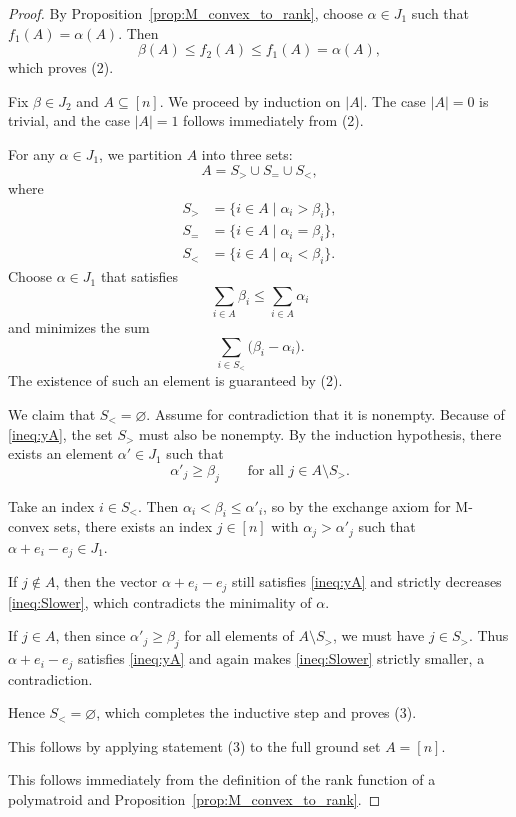 \documentclass[11pt]{article}
\theoremstyle{definition}
\theoremstyle{remark}
\begin{document}
\begin{proof}
\medskip
{}
By Proposition~\ref{prop:M_convex_to_rank}, choose $\alpha\in J_1$ such
that $f_1(A)=\alpha(A)$. Then
\[
    \beta(A)\leq f_2(A)\leq f_1(A)=\alpha(A),
\]
which proves (2).

\medskip
{}
Fix $\beta \in J_2$ and $A \subseteq [n]$. We proceed by induction on
$|A|$. The case $|A| = 0$ is trivial, and the case $|A|=1$ follows immediately from (2).

For any $\alpha \in J_1$, we partition $A$ into three sets:
\[
    A = S_> \cup S_= \cup S_<,
\]
where
\begin{align*}
    S_> &= \{i \in A \mid \alpha_i > \beta_i\}, \\
    S_= &= \{i \in A \mid \alpha_i = \beta_i\}, \\
    S_< &= \{i \in A \mid \alpha_i < \beta_i\}.
\end{align*}
Choose $\alpha \in J_1$ that satisfies
\begin{equation*}\label{ineq:yA}
    \sum_{i \in A} \beta_i \leq \sum_{i \in A} \alpha_i \tag{$\star$}
\end{equation*}
and minimizes the sum
\begin{equation*}\label{ineq:Slower}
    \sum_{i \in S_<} \bigl(\beta_i-\alpha_i\bigr). \tag{$\star\star$}
\end{equation*}
The existence of such an element is guaranteed by (2).

We claim that $S_< = \varnothing$. Assume for contradiction that it is
nonempty. Because of \eqref{ineq:yA}, the set $S_>$ must also be nonempty.
By the induction hypothesis, there exists an element $\alpha' \in J_1$ such
that
\[
    \alpha'_j \geq \beta_j
    \qquad\text{for all }j\in A\setminus S_>.
\]

Take an index $i \in S_<$. Then
$\alpha_i<\beta_i\leq\alpha'_i$, so by the exchange axiom for M-convex
sets, there exists an index $j\in[n]$ with
$\alpha_j>\alpha'_j$ such that
$\alpha+e_i-e_j\in J_1$.

If $j\notin A$, then the vector $\alpha+e_i-e_j$ still satisfies
\eqref{ineq:yA} and strictly decreases \eqref{ineq:Slower}, which
contradicts the minimality of $\alpha$.

If $j\in A$, then since $\alpha'_j\geq\beta_j$ for all elements of
$A\setminus S_>$, we must have $j\in S_>$. Thus
$\alpha+e_i-e_j$ satisfies \eqref{ineq:yA} and again makes
\eqref{ineq:Slower} strictly smaller, a contradiction.

Hence $S_<=\varnothing$, which completes the inductive step and proves
(3).

\medskip
{}
This follows by applying statement (3) to the full ground set $A=[n]$.

\medskip
{}
This follows immediately from the definition of the rank function of a
polymatroid and Proposition~\ref{prop:M_convex_to_rank}.
\end{proof}
\end{document}
